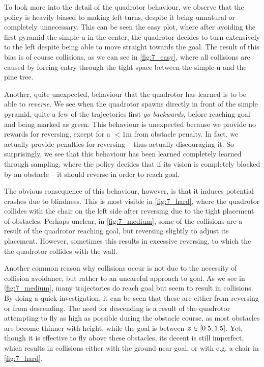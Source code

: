 To look more into the detail of the quadrotor behaviour, we observe that the policy is heavily biased to making left-turns, despite it being unnatural or completely unnecessary. This can be seen the easy plot, where after avoiding the first pyramid the simple-u in the center, the quadrotor decides to turn extensively to the left despite being able to move straight towards the goal. The result of this bias is of course collisions, as we can see in \cref{fig:7_easy}, where all collisions are caused by forcing entry through the tight space between the simple-u and the pine tree.

Another, quite unexpected, behaviour that the quadrotor has learned is to be able to \textit{reverse}. We see when the quadrotor spawns directly in front of the simple pyramid, quite a few of the trajectories first \textit{go backwards}, before reaching goal and being marked as green. This behaviour is unexpected because we provide no rewards for reversing, except for a $<1$m from obstacle penalty. In fact, we actually provide penalties for reversing -- thus actually discouraging it. So surprisingly, we see that this behaviour has been learned completely learned through sampling, where the policy decides that if its vision is completely blocked by an obstacle -- it should reverse in order to reach goal.

The obvious consequence of this behaviour, however, is that it induces potential crashes due to blindness. This is most visible in \cref{fig:7_hard}, where the quadrotor collides with the chair on the left side after reversing due to the tight placement of obstacles.
Perhaps unclear, in \cref{fig:7_medium}, some of the collisions are a result of the quadrotor reaching goal, but reversing slightly to adjust its placement. However, sometimes this results in excessive reversing, to which the the quadrotor collides with the wall. 

Another common reason why collisions occur is not due to the necessity of collision avoidance, but rather to an uncareful approach to goal. As we see in \cref{fig:7_medium}, many trajectories do reach goal but seem to result in collisions. By doing a quick investigation, it can be seen that these are either from reversing or from descending.
The need for descending is a result of the quadrotor attempting to fly as high as possible during the obstacle course, as most obstacles are become thinner with height, while the goal is between ${\boldsymbol{z}} \in [0.5, 1.5]$. Yet, though it is effective to fly above these obstacles, its decent is still imperfect, which results in collisions either with the ground near goal, or with e.g. a chair in \cref{fig:7_hard}. 

